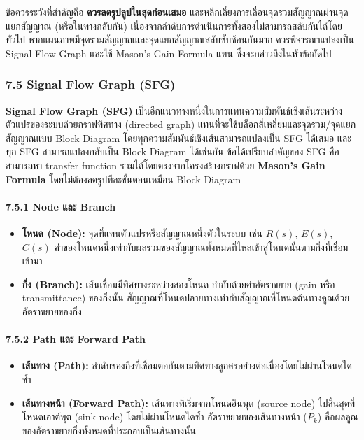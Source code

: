 ข้อควรระวังที่สำคัญคือ \textbf{ควรลดรูปลูปในสุดก่อนเสมอ} และหลีกเลี่ยงการเลื่อนจุดรวมสัญญาณผ่านจุดแยกสัญญาณ (หรือในทางกลับกัน) เนื่องจากลำดับการดำเนินการทั้งสองไม่สามารถสลับกันได้โดยทั่วไป หากแผนภาพมีจุดรวมสัญญาณและจุดแยกสัญญาณสลับซับซ้อนกันมาก ควรพิจารณาแปลงเป็น Signal Flow Graph และใช้ Mason's Gain Formula แทน ซึ่งจะกล่าวถึงในหัวข้อถัดไป

\subsubsection{7.5 Signal Flow Graph (SFG)}

\textbf{Signal Flow Graph (SFG)} เป็นอีกแนวทางหนึ่งในการแทนความสัมพันธ์เชิงเส้นระหว่างตัวแปรของระบบด้วยกราฟทิศทาง (directed graph) แทนที่จะใช้บล็อกสี่เหลี่ยมและจุดรวม/จุดแยกสัญญาณแบบ Block Diagram โดยทุกความสัมพันธ์เชิงเส้นสามารถแปลงเป็น SFG ได้เสมอ และทุก SFG สามารถแปลงกลับเป็น Block Diagram ได้เช่นกัน ข้อได้เปรียบสำคัญของ SFG คือสามารถหา transfer function รวมได้โดยตรงจากโครงสร้างกราฟด้วย \textbf{Mason's Gain Formula} โดยไม่ต้องลดรูปทีละขั้นตอนเหมือน Block Diagram

\paragraph{7.5.1 Node และ Branch}

\begin{itemize}
    \item \textbf{โหนด (Node):} จุดที่แทนตัวแปรหรือสัญญาณหนึ่งตัวในระบบ เช่น $R(s)$, $E(s)$, $C(s)$ ค่าของโหนดหนึ่งเท่ากับผลรวมของสัญญาณทั้งหมดที่ไหลเข้าสู่โหนดนั้นตามกิ่งที่เชื่อมเข้ามา
    \item \textbf{กิ่ง (Branch):} เส้นเชื่อมมีทิศทางระหว่างสองโหนด กำกับด้วยค่าอัตราขยาย (gain หรือ transmittance) ของกิ่งนั้น สัญญาณที่โหนดปลายทางเท่ากับสัญญาณที่โหนดต้นทางคูณด้วยอัตราขยายของกิ่ง
\end{itemize}

\paragraph{7.5.2 Path และ Forward Path}

\begin{itemize}
    \item \textbf{เส้นทาง (Path):} ลำดับของกิ่งที่เชื่อมต่อกันตามทิศทางลูกศรอย่างต่อเนื่องโดยไม่ผ่านโหนดใดซ้ำ
    \item \textbf{เส้นทางหน้า (Forward Path):} เส้นทางที่เริ่มจากโหนดอินพุต (source node) ไปสิ้นสุดที่โหนดเอาต์พุต (sink node) โดยไม่ผ่านโหนดใดซ้ำ อัตราขยายของเส้นทางหน้า ($P_k$) คือผลคูณของอัตราขยายกิ่งทั้งหมดที่ประกอบเป็นเส้นทางนั้น
\end{itemize}


